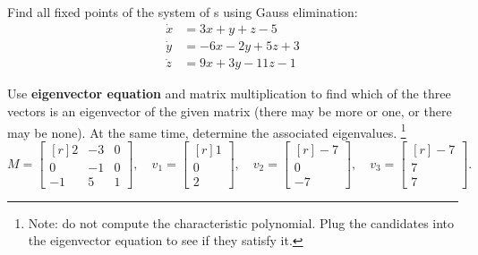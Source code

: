 \begin{question}
Find all fixed points of the system of \ode{}s using Gauss elimination:
  \begin{align*}
    \dot x &= 3x + y + z - 5 \\
    \dot y &= -6x -2y + 5z + 3 \\
    \dot z &= 9x + 3y -11z -1
  \end{align*}
\end{question}


\begin{question}
Use \textbf{eigenvector equation} and matrix multiplication to find which of the three vectors is an eigenvector of the given matrix (there may be more or one, or there may be none). At the same time, determine the associated eigenvalues. \footnote{Note: do not compute the characteristic polynomial. Plug the candidates into the eigenvector equation to see if they satisfy it.}
\begin{equation*}
  M = \begin{bmatrix*}[r]
    2 & -3 & 0 \\
    0 & -1 & 0 \\
    -1 & 5 & 1
  \end{bmatrix*},\quad
  v_{1} = \begin{bmatrix*}[r]
    1 \\ 0 \\ 2
  \end{bmatrix*}, \quad
  v_{2} = \begin{bmatrix*}[r]
    -7 \\ 0 \\ -7
  \end{bmatrix*}, \quad
  v_{3} = \begin{bmatrix*}[r]
    -7 \\ 7 \\ 7
  \end{bmatrix*}.
\end{equation*}
\end{question}

